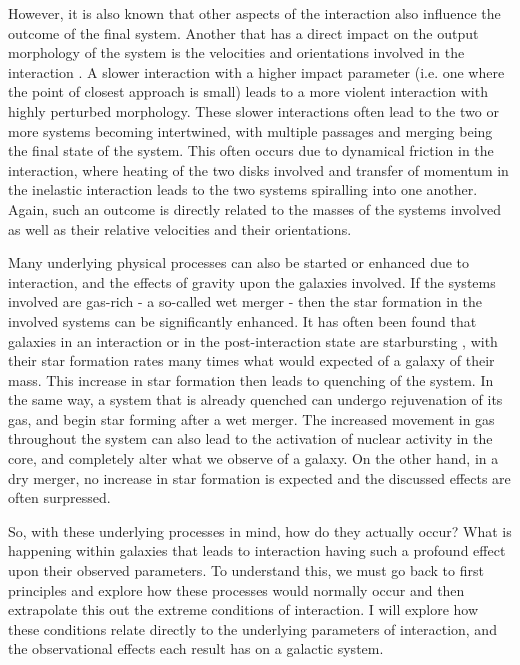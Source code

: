 However, it is also known that other aspects of the interaction also influence the outcome of the final system. Another that has a direct impact on the output morphology of the system is the velocities and orientations involved in the interaction \citep{Some review paper, perhaps that states that these parameters are important}. A slower interaction with a higher impact parameter (i.e. one where the point of closest approach is small) leads to a more violent interaction with highly perturbed morphology. These slower interactions often lead to the two or more systems becoming intertwined, with multiple passages and merging being the final state of the system. This often occurs due to dynamical friction in the interaction, where heating of the two disks involved and transfer of momentum in the inelastic interaction leads to the two systems spiralling into one another. Again, such an outcome is directly related to the masses of the systems involved as well as their relative velocities and their orientations. 

Many underlying physical processes can also be started or enhanced due to interaction, and the effects of gravity upon the galaxies involved. If the systems involved are gas-rich - a so-called wet merger - then the star formation in the involved systems can be significantly enhanced. It has often been found that galaxies in an interaction or in the post-interaction state are starbursting \citep{Paper on starbursting in interaction}, with their star formation rates many times what would expected of a galaxy of their mass. This increase in star formation then leads to quenching of the system. In the same way, a system that is already quenched can undergo rejuvenation of its gas, and begin star forming after a wet merger. The increased movement in gas throughout the system can also lead to the activation of nuclear activity in the core, and completely alter what we observe of a galaxy. On the other hand, in a dry merger, no increase in star formation is expected and the discussed effects are often surpressed.

So, with these underlying processes in mind, how do they actually occur? What is happening within galaxies that leads to interaction having such a profound effect upon their observed parameters. To understand this, we must go back to first principles and explore how these processes would normally occur and then extrapolate this out the extreme conditions of interaction. I will explore how these conditions relate directly to the underlying parameters of interaction, and the observational effects each result has on a galactic system.

